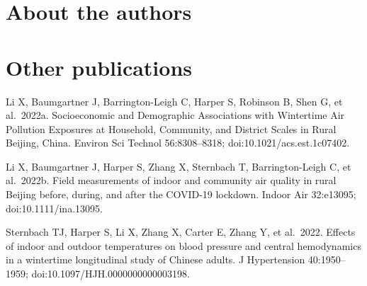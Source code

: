 \documentclass[
  letterpaper,
  DIV=11,
  numbers=noendperiod]{scrartcl}
\begin{document}
\newpage

\hypertarget{about-the-authors}{%
\section*{About the authors}\label{about-the-authors}}

\hypertarget{other-publications}{%
\section*{Other publications}\label{other-publications}}

Li X, Baumgartner J, Barrington-Leigh C, Harper S, Robinson B, Shen G,
et al.~2022a. Socioeconomic and Demographic Associations with Wintertime
Air Pollution Exposures at Household, Community, and District Scales in
Rural Beijing, China. Environ Sci Technol 56:8308--8318;
doi:10.1021/acs.est.1c07402.

Li X, Baumgartner J, Harper S, Zhang X, Sternbach T, Barrington-Leigh C,
et al.~2022b. Field measurements of indoor and community air quality in
rural Beijing before, during, and after the COVID-19 lockdown. Indoor
Air 32:e13095; doi:10.1111/ina.13095.

Sternbach TJ, Harper S, Li X, Zhang X, Carter E, Zhang Y, et al.~2022.
Effects of indoor and outdoor temperatures on blood pressure and central
hemodynamics in a wintertime longitudinal study of Chinese adults. J
Hypertension 40:1950--1959; doi:10.1097/HJH.0000000000003198.
\end{document}
